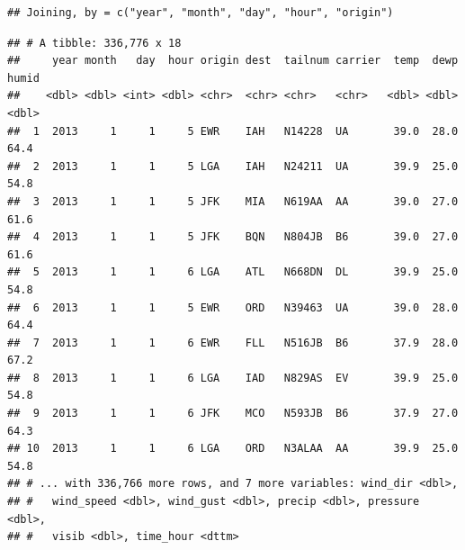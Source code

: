 \documentclass[]{book}
\newenvironment{Shaded}{\begin{snugshade}}{\end{snugshade}}
\newcommand{\CommentTok}[1]{\textcolor[rgb]{0.56,0.35,0.01}{\textit{#1}}}
\newcommand{\DataTypeTok}[1]{\textcolor[rgb]{0.13,0.29,0.53}{#1}}
\newcommand{\KeywordTok}[1]{\textcolor[rgb]{0.13,0.29,0.53}{\textbf{#1}}}
\newcommand{\NormalTok}[1]{#1}
\newcommand{\OperatorTok}[1]{\textcolor[rgb]{0.81,0.36,0.00}{\textbf{#1}}}
\newcommand{\StringTok}[1]{\textcolor[rgb]{0.31,0.60,0.02}{#1}}
\theoremstyle{definition}
\theoremstyle{definition}
\theoremstyle{definition}
\theoremstyle{remark}
\begin{document}
\begin{Shaded}
\end{Shaded}

\begin{verbatim}
## Joining, by = c("year", "month", "day", "hour", "origin")
\end{verbatim}

\begin{verbatim}
## # A tibble: 336,776 x 18
##     year month   day  hour origin dest  tailnum carrier  temp  dewp humid
##    <dbl> <dbl> <int> <dbl> <chr>  <chr> <chr>   <chr>   <dbl> <dbl> <dbl>
##  1  2013     1     1     5 EWR    IAH   N14228  UA       39.0  28.0  64.4
##  2  2013     1     1     5 LGA    IAH   N24211  UA       39.9  25.0  54.8
##  3  2013     1     1     5 JFK    MIA   N619AA  AA       39.0  27.0  61.6
##  4  2013     1     1     5 JFK    BQN   N804JB  B6       39.0  27.0  61.6
##  5  2013     1     1     6 LGA    ATL   N668DN  DL       39.9  25.0  54.8
##  6  2013     1     1     5 EWR    ORD   N39463  UA       39.0  28.0  64.4
##  7  2013     1     1     6 EWR    FLL   N516JB  B6       37.9  28.0  67.2
##  8  2013     1     1     6 LGA    IAD   N829AS  EV       39.9  25.0  54.8
##  9  2013     1     1     6 JFK    MCO   N593JB  B6       37.9  27.0  64.3
## 10  2013     1     1     6 LGA    ORD   N3ALAA  AA       39.9  25.0  54.8
## # ... with 336,766 more rows, and 7 more variables: wind_dir <dbl>,
## #   wind_speed <dbl>, wind_gust <dbl>, precip <dbl>, pressure <dbl>,
## #   visib <dbl>, time_hour <dttm>
\end{verbatim}

\begin{Shaded}
\end{Shaded}
\end{document}

